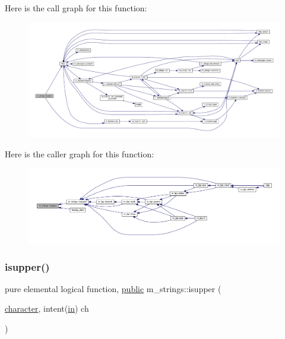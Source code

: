 Here is the call graph for this function\+:
\nopagebreak
\begin{figure}[H]
\begin{center}
\leavevmode
\includegraphics[width=350pt]{namespacem__strings_ab32380c29451e56395153155c1632d74_cgraph}
\end{center}
\end{figure}
Here is the caller graph for this function\+:
\nopagebreak
\begin{figure}[H]
\begin{center}
\leavevmode
\includegraphics[width=350pt]{namespacem__strings_ab32380c29451e56395153155c1632d74_icgraph}
\end{center}
\end{figure}
\mbox{\label{namespacem__strings_ac98536a1b69026cd5373dfff489f7733}} 
\subsubsection{\texorpdfstring{isupper()}{isupper()}}
{\footnotesize\ttfamily pure elemental logical function, \hyperlink{M__stopwatch_83_8txt_a2f74811300c361e53b430611a7d1769f}{public} m\+\_\+strings\+::isupper (\begin{DoxyParamCaption}\item[{\hyperlink{option__stopwatch_83_8txt_abd4b21fbbd175834027b5224bfe97e66}{character}, intent(\hyperlink{M__journal_83_8txt_afce72651d1eed785a2132bee863b2f38}{in})}]{ch }\end{DoxyParamCaption})}



